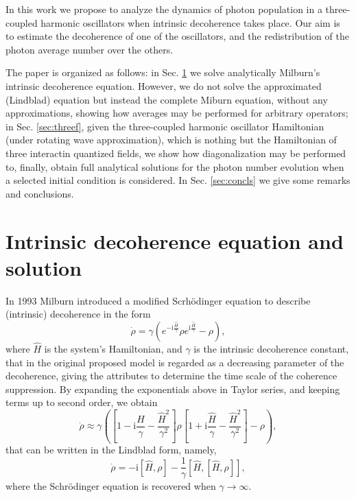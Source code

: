 \documentclass{article}
\newcommand{\mi}{\mathrm{i}}
\newcommand{\op}[1]{\hat{#1}}
\begin{document}
In this work we propose to analyze the dynamics of photon population in a three-coupled harmonic oscillators when  intrinsic decoherence  takes place. Our aim is to estimate the decoherence of one of the oscillators, and the redistribution of the photon average number over the others.

The paper is organized as follows: in Sec. \ref{sec:intdeco} we solve analytically Milburn's intrinsic decoherence equation. However, we do not solve the approximated (Lindblad) equation but instead the complete Miburn equation, without any approximations, showing how averages may be performed for arbitrary operators; in Sec. \ref{sec:threef},  given the three-coupled harmonic oscillator Hamiltonian (under rotating wave approximation), which is nothing but the Hamiltonian of three interactin quantized fields, we show how diagonalization may be performed to, finally, obtain full analytical solutions for the photon number evolution when a selected initial condition is considered. In Sec. \ref{sec:concls} we give some remarks and conclusions.

\section{Intrinsic decoherence equation and solution}\label{sec:intdeco}
In 1993 Milburn \cite{Milburn1991} introduced a modified Scrh\"odinger equation to describe (intrinsic) decoherence in the form
\begin{equation}\label{0010}
    \dot{\rho}=\gamma \left(e^{-\mi\frac{\op{H}}{\gamma}}\rho e^{\mi\frac{\op{H}}{\gamma}}- \rho\right),
\end{equation}
where $\op{H}$ is the system's Hamiltonian, and $\gamma$ is the intrinsic decoherence constant, that in the original proposed model is regarded as a decreasing parameter of the decoherence, giving the attributes to determine the time scale of the coherence suppression. By expanding the exponentials above in Taylor series, and keeping terms up to second order, we obtain
\begin{equation}\label{0011}
    \dot{\rho}\approx\gamma \left(\left[1-\mi\frac{\op{H}}{\gamma}-\frac{\op{H}^{2}}{\gamma^2}\right]\rho \left[1+\mi\frac{\op{H}}{\gamma}-\frac{\op{H}^2}{\gamma^2}\right]- \rho\right),
\end{equation}
that can be written in the Lindblad form, namely,
\begin{equation*}
    \dot{\rho}=-\mi\left[\op{H},\rho\right]-\frac{1}{\gamma}\left[\op{H},\left[\op{H},\rho\right]\right],
\end{equation*}
where the Schr\"odinger equation is recovered when $\gamma\rightarrow\infty$. 
\end{document}
